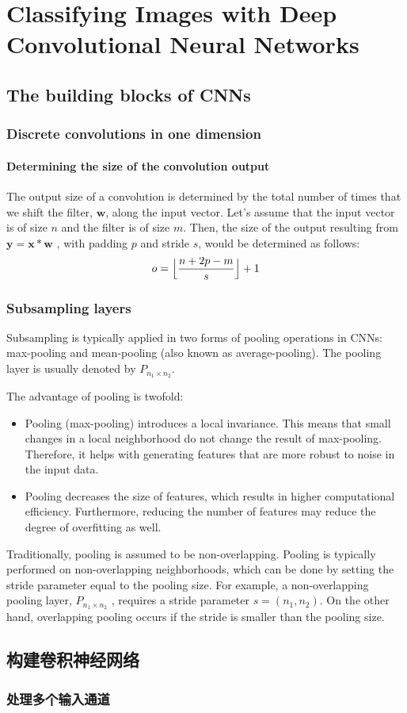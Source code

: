 \chapter{Classifying Images with Deep Convolutional Neural Networks\label{Ch14}}
\section{The building blocks of CNNs}
\subsection{Discrete convolutions in one dimension}
\subsubsection*{Determining the size of the convolution output}
The output size of a convolution is determined by the total number of times that we shift the filter, $\bm{w}$, along the input vector. Let's assume that the input vector is of size $n$ and the filter is of size $m$. Then, the size of the output resulting from $\bm{y}=\bm{x}*\bm{w}$ , with padding $p$ and stride $s$, would be determined as follows:
\begin{equation}
    o=\Bigl\lfloor\frac{n+2p-m}{s}\Bigr\rfloor+1
\end{equation}

\subsection{Subsampling layers}
Subsampling is typically applied in two forms of pooling operations in CNNs: max-pooling and
mean-pooling (also known as average-pooling). The pooling layer is usually denoted by $P_{n_1\times n_2}$.

The advantage of pooling is twofold:
\begin{itemize}
    \item Pooling (max-pooling) introduces a local invariance. This means that small changes in a local neighborhood do not change the result of max-pooling. Therefore, it helps with generating features that are more robust to noise in the input data.
    \item Pooling decreases the size of features, which results in higher computational efficiency. Furthermore, reducing the number of features may reduce the degree of overfitting as well.
\end{itemize}

\begin{tcolorbox}[title=Overlapping versus non-overlapping pooling]
    Traditionally, pooling is assumed to be non-overlapping. Pooling is typically performed on non-overlapping neighborhoods, which can be done by setting the stride parameter equal to the pooling size. For example, a non-overlapping pooling layer, $P_{n_1\times n_2}$ , requires a stride parameter $s = (n_1, n_2)$. On the other hand, overlapping pooling occurs if the stride is smaller than the pooling size.
\end{tcolorbox}
\section{构建卷积神经网络}
\subsection{处理多个输入通道}
